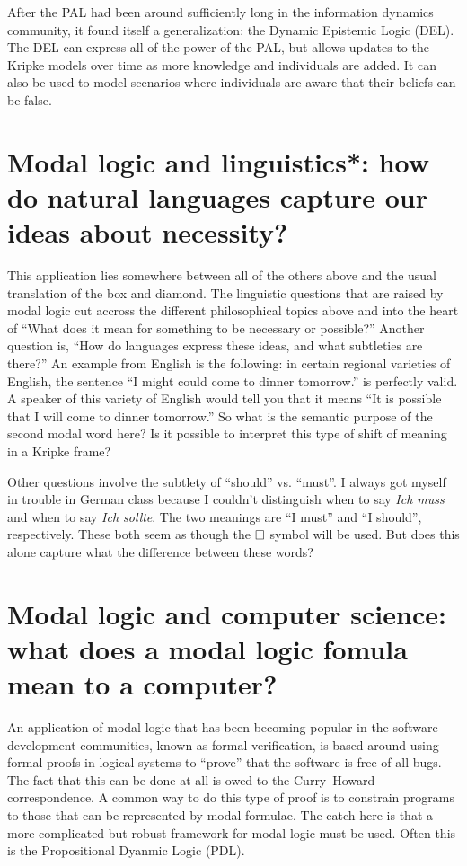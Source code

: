After the PAL had been around sufficiently long in the information dynamics community, it found itself a generalization: the Dynamic Epistemic
Logic (DEL). The DEL can express all of the power of the PAL, but allows updates to the Kripke models over time as more knowledge and individuals
are added. It can also be used to model scenarios where individuals are aware that their beliefs can be false.

\section{Modal logic and linguistics*: how do natural languages capture our ideas about necessity?}

This application lies somewhere between all of the others above and the usual translation of the box and diamond. The linguistic questions that are
raised by modal logic cut accross the different philosophical topics above and into the heart of ``What does it mean for something to be necessary
or possible?'' Another question is, ``How do languages express these ideas, and what subtleties are there?'' An example from English is the
following: in certain regional varieties of English, the sentence ``I might could come to dinner tomorrow.'' is perfectly valid. A speaker
of this variety of English would tell you that it means ``It is possible that I will come to dinner tomorrow.'' So what is the semantic purpose
of the second modal word here? Is it possible to interpret this type of shift of meaning in a Kripke frame?

Other questions involve the subtlety of ``should'' vs. ``must''. I always got myself in trouble in German class because I couldn't distinguish
when to say \emph{Ich muss} and when to say \emph{Ich sollte}. The two meanings are ``I must'' and ``I should'', respectively. These both seem
as though the $\square$ symbol will be used. But does this alone capture what the difference between these words? 

\section{Modal logic and computer science: what does a modal logic fomula mean to a computer?}
An application of modal logic that has been becoming popular in the software development communities, known as formal verification, is based
around using formal proofs in logical systems to ``prove'' that the software is free of all bugs. The fact that this can be done at all
is owed to the Curry--Howard correspondence. A common way to do this type of proof is to constrain programs to those that can be represented
by modal formulae. The catch here is that a more complicated but robust framework for modal logic must be used. Often this is the Propositional
Dyanmic Logic (PDL).

